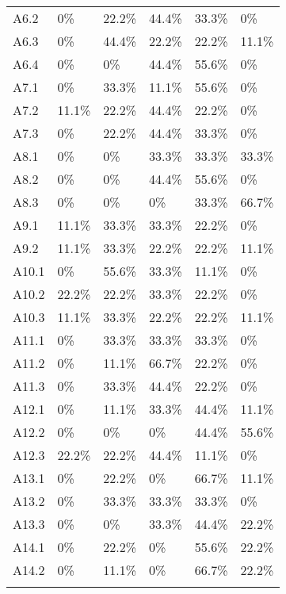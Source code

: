 \begin{longtable}{  p{}   p{}  p{}  p{}  p{}  p{} }
      A6.2 & 0\% & 22.2\% & 44.4\% &  33.3\% & 0\%
     \\ 
    A6.3 & 0\% & 44.4\% & 22.2\% & 22.2\%  &  11.1\%   
    \\ 
    A6.4 & 0\% & 0\%  & 44.4\%  & 55.6\%  & 0\% 
    \\
     \hline
      A7.1 & 0\% & 33.3\% & 11.1\% & 55.6\% & 0\% 
      \\
      A7.2 & 11.1\% & 22.2\% & 44.4\% & 22.2\% & 0\%
     \\ 
    A7.3 & 0\% & 22.2\% & 44.4\% & 33.3\%  &  0\%   
    \\ 
    \hline
      A8.1 & 0\% & 0\% & 33.3\% & 33.3\% & 33.3\% 
      \\
      A8.2 & 0\% & 0\% & 44.4\% & 55.6\% & 0\%
     \\ 
    A8.3 & 0\% & 0\% &  0\% & 33.3\% & 66.7\%    
    \\ 
    \hline
      A9.1 & 11.1\% & 33.3\% & 33.3\% & 22.2\% & 0\% 
      \\
      A9.2 & 11.1\% & 33.3\% & 22.2\% & 22.2\% & 11.1\%
     \\ 
     \hline
      A10.1 & 0\% & 55.6\% & 33.3\% & 11.1\% & 0\% 
      \\
      A10.2 & 22.2\% & 22.2\% & 33.3\% & 22.2\% & 0\%
     \\ 
    A10.3 & 11.1\% & 33.3\% & 22.2\% & 22.2\%  &  11.1\%   
    \\ 
     \hline
      A11.1 & 0\% & 33.3\% & 33.3\% & 33.3\% & 0\% 
      \\
      A11.2 & 0\% & 11.1\% & 66.7\% & 22.2\% & 0\%
     \\ 
    A11.3 &  0\% & 33.3\% & 44.4\% & 22.2\% & 0\%   
    \\ 
     \hline
      A12.1 & 0\% & 11.1\% & 33.3\% & 44.4\% & 11.1\% 
      \\
      A12.2 & 0\% & 0\% & 0\% & 44.4\% & 55.6\%
     \\ 
    A12.3 & 22.2\% & 22.2\% & 44.4\% & 11.1\% & 0\%   
    \\ 
    \hline
      A13.1 & 0\% & 22.2\% & 0\% & 66.7\% & 11.1\% 
      \\
      A13.2 & 0\% & 33.3\% & 33.3\% & 33.3\% & 0\%
     \\ 
    A13.3 & 0\% &  0\% & 33.3\% & 44.4\% & 22.2\%   
    \\ 
    \hline
      A14.1 & 0\% & 22.2\% & 0\% & 55.6\% & 22.2\% 
      \\
      A14.2 & 0\% & 11.1\% & 0\% & 66.7\% & 22.2\%
     \\ 
    \bottomrule 
    \label{tab:AttributionResponsesFrequencies}  
\end{longtable}

